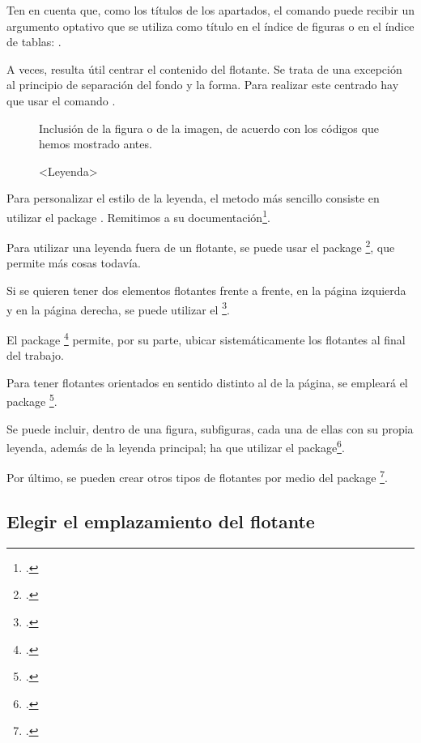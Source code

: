 Ten en cuenta que, como los títulos de los apartados, el comando  puede recibir un argumento optativo que se utiliza como título en el índice de figuras o en el índice de tablas: 
. 


\begin{plusloins}

A veces, resulta útil centrar el contenido del flotante. Se trata de una excepción al principio de separación del fondo y la forma. Para realizar este centrado hay que usar el comando .

\begin{latexcode}
\begin{figure}[<parámetro de ubicación>]
    \centering
    Inclusión de la figura o de la imagen,
    de acuerdo con los códigos que hemos mostrado antes.
    \caption{<Leyenda>}
\end{figure} 
\end{latexcode}


Para personalizar el estilo de la leyenda, el metodo más sencillo consiste en utilizar el package . Remitimos a su documentación\footcite{caption}.

Para utilizar una leyenda fuera de un flotante, se puede usar el package \footcite{ccaption}, que permite más cosas todavía.

Si se quieren tener dos elementos flotantes frente a frente, en la página izquierda y en la página derecha, se puede utilizar el \footcite{dpfloat}.

El package \footcite{endfloat} permite, por su parte, ubicar sistemáticamente los flotantes al final del trabajo.

Para tener flotantes orientados en sentido distinto al de la página, se empleará el package \footcite{rotfloat}.

Se puede incluir, dentro de una figura, subfiguras, cada una de ellas con su propia leyenda, además de la leyenda principal; ha que utilizar el package\footcite{subcaption}.

Por último, se pueden crear otros tipos de flotantes por medio del package \footcite{float}.
\end{plusloins}



\subsection{Elegir el emplazamiento del flotante}

